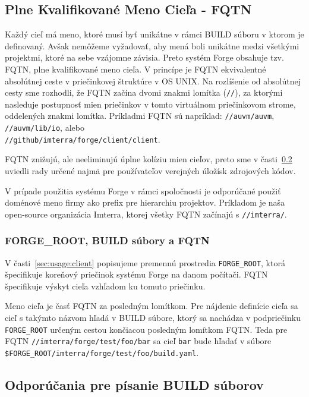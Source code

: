 \subsection{Plne Kvalifikovan\'{e} Meno Cie\v{l}a - FQTN}

Každý cieľ má meno, ktoré musí byť unikátne v rámci BUILD súboru v ktorom je definovaný.
Avšak nemôžeme vyžadovať, aby mená boli unikátne medzi všetkými projektmi, ktoré na
sebe vzájomne závisia. Preto systém Forge obsahuje tzv. FQTN, plne kvalifikované meno
cieľa. V princípe je FQTN ekvivalentné absolútnej ceste v priečinkovej štruktúre v OS UNIX\@.
Na rozlíšenie od absolútnej cesty sme rozhodli, že FQTN začína dvomi znakmi lomítka (\texttt{//}),
za ktorými nasleduje postupnosť mien priečinkov v tomto virtuálnom priečinkovom strome, oddelených
znakmi lomítka. Príkladmi FQTN sú napríklad: \texttt{//auvm/auvm}, \texttt{//auvm/lib/io}, alebo \\
\texttt{//github/imterra/forge/client/client}.

FQTN znižujú, ale neeliminujú úplne kolíziu mien cieľov, preto sme v časti~\ref{sec:buildfiles:bestpractices}
uviedli rady určené najmä pre používateľov verejných úložísk zdrojových kódov.

V prípade použitia systému Forge v rámci spoločnosti je odporúčané použiť doménové meno firmy
ako prefix pre hierarchiu projektov. Príkladom je naša open-source organizácia Imterra, ktorej všetky
FQTN začínajú s \texttt{//imterra/}.

\subsubsection{FORGE\_ROOT, BUILD súbory a FQTN}

V časti~\ref{sec:usage:client} popisujeme premennú prostredia \texttt{FORGE\_ROOT}, ktorá
špecifikuje koreňový priečinok systému Forge na danom počítači. FQTN špecifikuje výskyt
cieľa vzhľadom ku tomuto priečinku.

Meno cieľa je časť FQTN za posledným lomítkom. Pre nájdenie definície cieľa sa cieľ
s takýmto názvom hľadá v BUILD súbore, ktorý sa nachádza v podpriečinku \texttt{FORGE\_ROOT}
určeným cestou končiacou posledným lomítkom FQTN\@. Teda pre FQTN \texttt{//imterra/forge/test/foo/bar}
sa cieľ \texttt{bar} bude hľadať v súbore \\
\texttt{\$FORGE\_ROOT/imterra/forge/test/foo/build.yaml}.

\subsection{Odpor\'{u}\v{c}ania pre p\'{i}sanie BUILD s\'{u}borov}
\label{sec:buildfiles:bestpractices}

